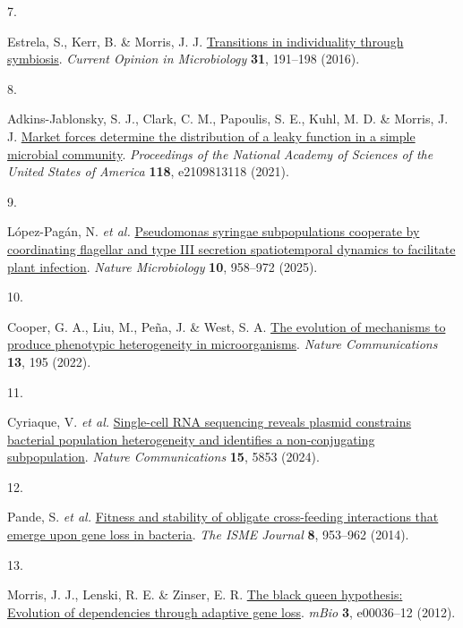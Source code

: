 \documentclass[
  11pt,
  a4paper,
]{report}
\newlength{\cslhangindent}
\newlength{\csllabelwidth}
\newenvironment{CSLReferences}[2] %
 {\begin{list}{}{%
  \setlength{\itemindent}{0pt}
  \setlength{\leftmargin}{0pt}
  \setlength{\parsep}{0pt}
  \ifodd #1
   \setlength{\leftmargin}{\cslhangindent}
   \setlength{\itemindent}{-1\cslhangindent}
  \fi
  \setlength{\itemsep}{#2\baselineskip}}}
 {\end{list}}
\newcommand{\CSLLeftMargin}[1]{\parbox[t]{\csllabelwidth}{\strut#1\strut}}
\newcommand{\CSLRightInline}[1]{\parbox[t]{\linewidth - \csllabelwidth}{\strut#1\strut}}
\begin{document}
\begin{CSLReferences}{0}{0}
\CSLLeftMargin{7. }%
\CSLRightInline{Estrela, S., Kerr, B. \& Morris, J. J.
\href{https://doi.org/10.1016/j.mib.2016.04.007}{Transitions in
individuality through symbiosis}. \emph{Current Opinion in Microbiology}
\textbf{31}, 191--198 (2016).}

\CSLLeftMargin{8. }%
\CSLRightInline{Adkins-Jablonsky, S. J., Clark, C. M., Papoulis, S. E.,
Kuhl, M. D. \& Morris, J. J.
\href{https://doi.org/10.1073/pnas.2109813118}{Market forces determine
the distribution of a leaky function in a simple microbial community}.
\emph{Proceedings of the National Academy of Sciences of the United
States of America} \textbf{118}, e2109813118 (2021).}

\CSLLeftMargin{9. }%
\CSLRightInline{López-Pagán, N. \emph{et al.}
\href{https://doi.org/10.1038/s41564-025-01966-0}{Pseudomonas syringae
subpopulations cooperate by coordinating flagellar and type III
secretion spatiotemporal dynamics to facilitate plant infection}.
\emph{Nature Microbiology} \textbf{10}, 958--972 (2025).}

\CSLLeftMargin{10. }%
\CSLRightInline{Cooper, G. A., Liu, M., Peña, J. \& West, S. A.
\href{https://doi.org/10.1038/s41467-021-27902-4}{The evolution of
mechanisms to produce phenotypic heterogeneity in microorganisms}.
\emph{Nature Communications} \textbf{13}, 195 (2022).}

\CSLLeftMargin{11. }%
\CSLRightInline{Cyriaque, V. \emph{et al.}
\href{https://doi.org/10.1038/s41467-024-49793-x}{Single-cell RNA
sequencing reveals plasmid constrains bacterial population heterogeneity
and identifies a non-conjugating subpopulation}. \emph{Nature
Communications} \textbf{15}, 5853 (2024).}

\CSLLeftMargin{12. }%
\CSLRightInline{Pande, S. \emph{et al.}
\href{https://doi.org/10.1038/ismej.2013.211}{Fitness and stability of
obligate cross-feeding interactions that emerge upon gene loss in
bacteria}. \emph{The ISME Journal} \textbf{8}, 953--962 (2014).}

\CSLLeftMargin{13. }%
\CSLRightInline{Morris, J. J., Lenski, R. E. \& Zinser, E. R.
\href{https://doi.org/10.1128/mBio.00036-12}{The black queen hypothesis:
Evolution of dependencies through adaptive gene loss}. \emph{mBio}
\textbf{3}, e00036--12 (2012).}


\end{CSLReferences}
\end{document}

